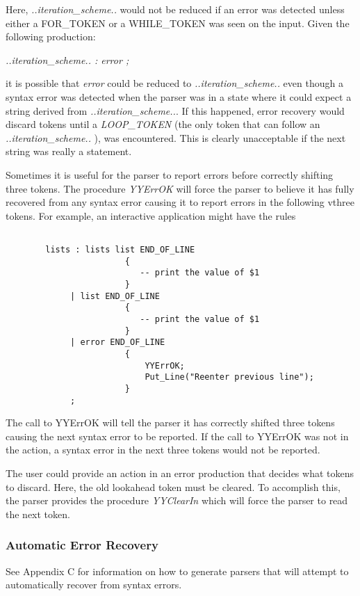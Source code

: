Here,
{\it ..iteration\_scheme..}
would not be reduced if an error was detected
unless either a FOR\_TOKEN or a WHILE\_TOKEN was seen on the input.  Given
the following production:

\centerline{\it ..iteration\_scheme.. : error ;}

\noindent it is possible that
{\it error}
could be reduced to
{\it ..iteration\_scheme..}
even though a syntax error was detected when the parser was in a state
where it could expect a string derived from
{\it ..iteration\_scheme..}.
If this happened,
error recovery would discard tokens until a
{\it LOOP\_TOKEN}
(the only token that can follow an
{\it ..iteration\_scheme..}
),
was encountered.  This is clearly unacceptable if
the next string was really a statement.

Sometimes it is useful for the parser to report errors before correctly
shifting
three tokens.  The procedure
{\it YYErrOK}
will force the parser to believe it has fully recovered from
any syntax error causing it to report errors in the following
vthree tokens.  For example, an interactive application might have the
rules
\begin{verbatim}

        lists : lists list END_OF_LINE
                        {
                           -- print the value of $1
                        }
             | list END_OF_LINE
                        {
                           -- print the value of $1
                        }
             | error END_OF_LINE
                        {
                            YYErrOK;
                            Put_Line("Reenter previous line");
                        }
             ;

\end{verbatim}

The call to YYErrOK will tell the parser it has correctly shifted
three tokens causing the next syntax error to be reported.  If the
call to YYErrOK was not in the action,
a syntax error in the next three tokens would not be reported.

The user could provide an action in an error production that
decides what tokens to discard.  Here, the old lookahead token must be
cleared.  To accomplish this, the parser provides the procedure
{\it YYClearIn}
which will force the parser to read the next token.
\subsubsection{Automatic Error Recovery}
See Appendix C for information on how to generate parsers that will
attempt to automatically recover from syntax errors.
